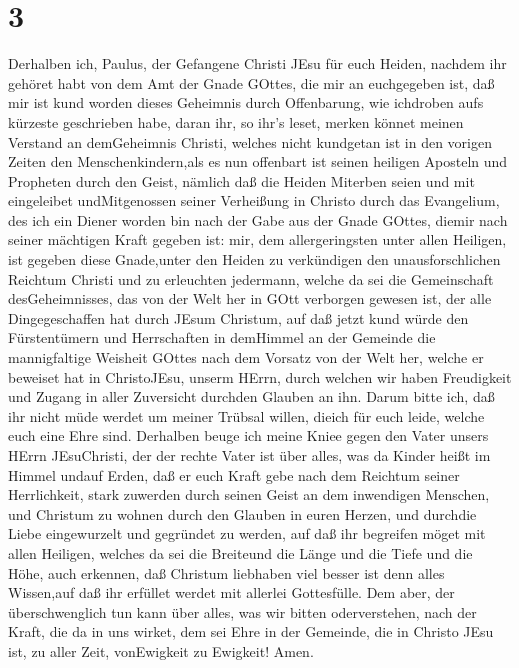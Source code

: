 \hypertarget{section-2}{%
\section{3}\label{section-2}}

 Derhalben ich, Paulus, der Gefangene Christi JEsu für euch
Heiden,  nachdem ihr gehöret habt von dem Amt der Gnade
GOttes, die mir an euchgegeben ist,  daß mir ist kund worden
dieses Geheimnis durch Offenbarung, wie ichdroben aufs kürzeste
geschrieben habe,  daran ihr, so ihr's leset, merken könnet
meinen Verstand an demGeheimnis Christi,  welches nicht
kundgetan ist in den vorigen Zeiten den Menschenkindern,als es nun
offenbart ist seinen heiligen Aposteln und Propheten durch den Geist,
 nämlich daß die Heiden Miterben seien und mit eingeleibet
undMitgenossen seiner Verheißung in Christo durch das Evangelium,
 des ich ein Diener worden bin nach der Gabe aus der Gnade
GOttes, diemir nach seiner mächtigen Kraft gegeben ist: 
mir, dem allergeringsten unter allen Heiligen, ist gegeben diese
Gnade,unter den Heiden zu verkündigen den unausforschlichen Reichtum
Christi  und zu erleuchten jedermann, welche da sei die
Gemeinschaft desGeheimnisses, das von der Welt her in GOtt verborgen
gewesen ist, der alle Dingegeschaffen hat durch JEsum Christum,
 auf daß jetzt kund würde den Fürstentümern und
Herrschaften in demHimmel an der Gemeinde die mannigfaltige Weisheit
GOttes  nach dem Vorsatz von der Welt her, welche er
beweiset hat in ChristoJEsu, unserm HErrn,  durch welchen
wir haben Freudigkeit und Zugang in aller Zuversicht durchden Glauben an
ihn.  Darum bitte ich, daß ihr nicht müde werdet um meiner
Trübsal willen, dieich für euch leide, welche euch eine Ehre sind.
 Derhalben beuge ich meine Kniee gegen den Vater unsers
HErrn JEsuChristi,  der der rechte Vater ist über alles,
was da Kinder heißt im Himmel undauf Erden,  daß er euch
Kraft gebe nach dem Reichtum seiner Herrlichkeit, stark zuwerden durch
seinen Geist an dem inwendigen Menschen,  und Christum zu
wohnen durch den Glauben in euren Herzen, und durchdie Liebe
eingewurzelt und gegründet zu werden,  auf daß ihr
begreifen möget mit allen Heiligen, welches da sei die Breiteund die
Länge und die Tiefe und die Höhe,  auch erkennen, daß
Christum liebhaben viel besser ist denn alles Wissen,auf daß ihr
erfüllet werdet mit allerlei Gottesfülle.  Dem aber, der
überschwenglich tun kann über alles, was wir bitten oderverstehen, nach
der Kraft, die da in uns wirket,  dem sei Ehre in der
Gemeinde, die in Christo JEsu ist, zu aller Zeit, vonEwigkeit zu
Ewigkeit! Amen.

